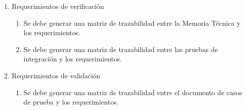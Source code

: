 \documentclass[
11pt, %
]{charter}
\begin{document}
\begin{enumerate}
	\item Requerimientos de verificación
		\begin{enumerate}
			\item Se debe generar una matriz de trazabilidad entre la Memoria Técnica y los requerimientos.
			\item Se debe generar una matriz de trazabilidad entre las pruebas de integración y los requerimientos.
		\end{enumerate}			
			
	\item Requerimientos de validación
		\begin{enumerate}
			\item Se debe generar una matriz de trazabilidad entre el documento de casos de prueba y los requerimientos.
		\end{enumerate}			
\end{enumerate}

%
%
%
%
%
%
\end{document}
